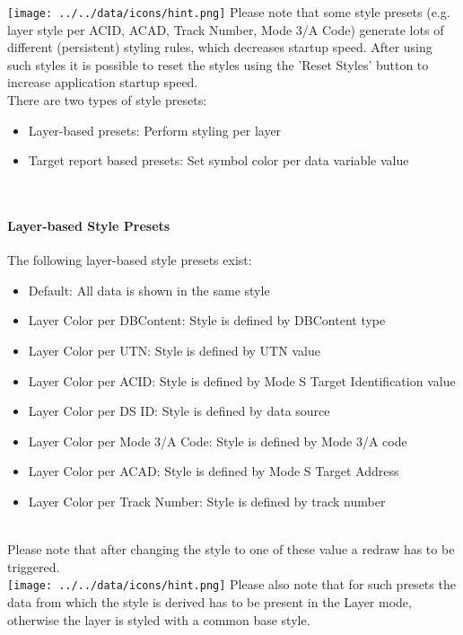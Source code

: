 \texttt{[image: ../../data/icons/hint.png]} Please note that some style presets (e.g. layer style per ACID, ACAD, Track Number, Mode 3/A Code) generate lots of different (persistent) styling rules, which decreases startup speed. After using such styles it is possible to reset the styles using the 'Reset Styles' button to increase application startup speed. \\

There are two types of style presets:
\begin{itemize}
 \item Layer-based presets: Perform styling per layer
 \item Target report based presets: Set symbol color per data variable value
\end{itemize}
\  \\

\paragraph{Layer-based Style Presets}
The following layer-based style presets exist:
\begin{itemize}
 \item Default: All data is shown in the same style
 \item Layer Color per DBContent: Style is defined by DBContent type
 \item Layer Color per UTN: Style is defined by UTN value
 \item Layer Color per ACID: Style is defined by Mode S Target Identification value
 \item Layer Color per DS ID: Style is defined by data source
 \item Layer Color per Mode 3/A Code: Style is defined by Mode 3/A code
 \item Layer Color per ACAD: Style is defined by Mode S Target Address
 \item Layer Color per Track Number: Style is defined by track number
\end{itemize}
\  \\

Please note that after changing the style to one of these value a redraw has to be triggered. \\

\texttt{[image: ../../data/icons/hint.png]} Please also note that for such presets the data from which the style is derived has to be present in the Layer mode, otherwise the layer is styled with a common base style.

